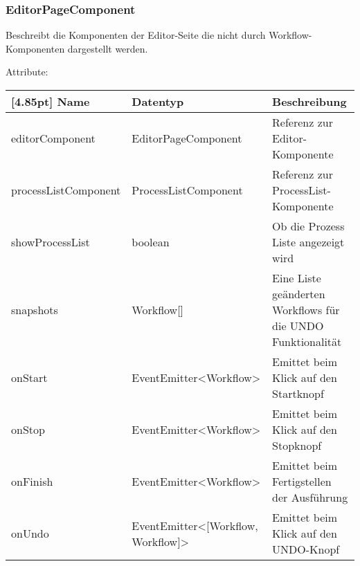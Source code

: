 \newpage

			\subsubsection{EditorPageComponent}
			
			Beschreibt die Komponenten der Editor-Seite die nicht durch Workflow-Komponenten dargestellt werden.\newline
			
			Attribute:
			\begin{center}
				\renewcommand{\arraystretch}{1.5}
				\setlength\tabcolsep{5pt}
				\begin{tabularx}{\textwidth}{|l|l|X|}
					\hline
					\rowcolor[gray]{0.75}[4.85pt]					
					Name & Datentyp & Beschreibung \\ \hline
					editorComponent  & EditorPageComponent & Referenz zur Editor-Komponente \\ \hline
					processListComponent  & ProcessListComponent & Referenz zur ProcessList-Komponente \\ \hline
					showProcessList  & boolean & Ob die Prozess Liste angezeigt wird \\ \hline
					snapshots  & Workflow[] & Eine Liste geänderten Workflows für die UNDO Funktionalität \\ \hline
					onStart  & EventEmitter<Workflow> & Emittet beim Klick auf den Startknopf \\ \hline
					onStop  & EventEmitter<Workflow> & Emittet beim Klick auf den Stopknopf \\ \hline
					onFinish  & EventEmitter<Workflow> & Emittet beim Fertigstellen der Ausführung \\ \hline
					onUndo  & EventEmitter<[Workflow, Workflow]> & Emittet beim Klick auf den UNDO-Knopf \\ \hline
				\end{tabularx}
			\end{center}
			
